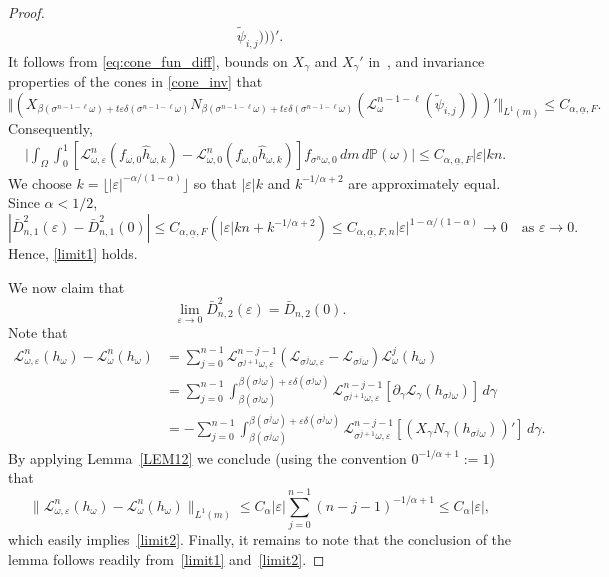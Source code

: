 \documentclass[12pt,reqno,a4paper]{article}
\newcommand{\ve}{\varepsilon}
\newcommand\cL{{\mathcal L}}
\newcommand\bP{{\mathbb P}}
\begin{document}
\begin{proof}
\begin{align*}
		\tilde{\psi}_{i,j} )  ) )'.
	\end{align*}
	It follows from \eqref{eq:cone_fun_diff},
	bounds on $X_\gamma$ and $X_\gamma'$ in~\cite[(2.3) and (2.4)]{BT}, 
	and invariance properties of the cones in \eqref{cone_inv} that
	$$
	\Vert ( X_{  \beta( \sigma^{n-1-\ell} \omega  ) + t \ve \delta(\sigma^{n-1-\ell}  \omega ) } N_{  \beta( \sigma^{n-1-\ell} \omega  ) + t \ve \delta(\sigma^{n-1-\ell}  \omega ) } (   \cL_{ \omega }^{n-1-\ell} ( \tilde{\psi}_{i,j} )  ) )' \Vert_{L^1(m)} \le C_{\alpha, \underline{\alpha}, F}.
	$$ 
	Consequently,
	\begin{align*}
		&\biggl| \int_\Omega \int_0^1 
		[ \cL_{\omega, \ve}^n ( f_{\omega, 0}   \hat{h}_{\omega, k} ) 
		- \cL_{\omega, 0}^n ( f_{\omega, 0}   \hat{h}_{\omega, k} ) ] 
		f_{\sigma^n\omega, 0} \, d m \, d \bP(\omega)  \biggr| 
		\le C_{\alpha, \underline{\alpha}, F} |\ve| kn.
	\end{align*}
	We choose $k = \lfloor  |\ve|^{ - \alpha / ( 1 - \alpha )  } \rfloor$ so that 
	$|\ve| k$ and $k^{- 1 / \alpha + 2}$ are approximately equal. Since $\alpha < 1/2$, 
	$$
	|\bar{D}_{n,1}^2(\ve) - \bar{D}_{n,1}^2(0)| \le C_{\alpha, \underline{\alpha}, F} (|\ve| kn +  k^{- 1 / \alpha + 2} )\le C_{\alpha, \underline{\alpha}, F, n}|\ve|^{ 1 - \alpha / ( 1 - \alpha ) } \to 0 \quad 
	\text{as $\ve \to 0$}.
	$$
	Hence, \eqref{limit1} holds.
	
	We now claim that 
	\begin{equation}\label{limit2}
		\lim_{\ve \to 0}\bar{D}_{n, 2}^2(\ve)=\bar{D}_{n, 2}(0).
	\end{equation}
	Note that 
	\[
	\begin{split}
		\mathcal L_{\omega, \varepsilon}^n (h_\omega)-\mathcal L_\omega^n (h_\omega) &=\sum_{j=0}^{n-1} \mathcal L_{\sigma^{j+1} \omega, \varepsilon}^{n-j-1}(\mathcal L_{\sigma^{j}\omega, \varepsilon}-\mathcal L_{\sigma^{j}\omega})\mathcal L_\omega^{j}(h_\omega) \\
		&=\sum_{j=0}^{n-1} \int_{\beta(\sigma^{j}\omega)}^{\beta(\sigma^{j}\omega)+\ve \delta(\sigma^{j}\omega)}\mathcal L_{\sigma^{j +1}\omega, \varepsilon}^{n-j-1}[\partial_\gamma \mathcal L_\gamma (h_{\sigma^{j}\omega})]\, d\gamma \\
		&=-\sum_{j=0}^{n-1} \int_{\beta(\sigma^{j}\omega)}^{\beta(\sigma^{j}\omega)+\ve \delta(\sigma^{j}\omega)} \mathcal L_{\sigma^{j+1} \omega, \varepsilon}^{n-j-1}[(X_\gamma N_\gamma(h_{\sigma^{j}\omega}))']\, d\gamma.
	\end{split}
	\]
	By applying Lemma~\ref{LEM12} we conclude (using the convention $0^{-1/\alpha+1}:=1$) that 
	\[
	\|\mathcal L_{\omega, \varepsilon}^n (h_\omega)-\mathcal L_\omega^n (h_\omega)\|_{L^1(m)}\le C_\alpha |\ve|\sum_{j=0}^{n-1} (n-j-1)^{-1/\alpha+1}\le C_\alpha|\ve|,
	\]
	which easily implies~\eqref{limit2}. Finally, it remains to note that  the conclusion of the lemma follows readily from~\eqref{limit1} and~\eqref{limit2}.
\end{proof}
\end{document}

